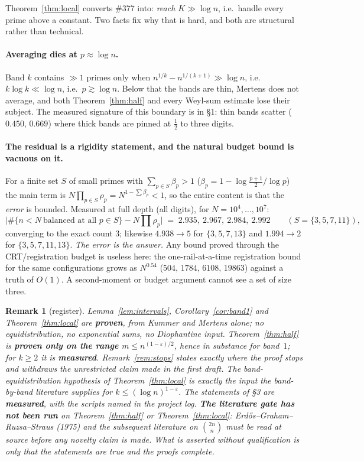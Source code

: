 \documentclass[11pt]{article}
\newtheorem{remark}[theorem]{Remark}
\begin{document}
Theorem~\ref{thm:local} converts \#377 into: \emph{reach $K\gg\log n$}, i.e.\
handle every prime above a constant.  Two facts fix why that is hard, and both
are structural rather than technical.

\paragraph{Averaging dies at $p\approx\log n$.}  Band $k$ contains
$\gg1$ primes only when $n^{1/k}-n^{1/(k+1)}\gg\log n$, i.e.\ $k\log k\ll\log n$,
i.e.\ $p\gtrsim\log n$.  Below that the bands are thin, Mertens does not
average, and both Theorem~\ref{thm:half} and every Weyl-sum estimate lose their
subject.  The measured signature of this boundary is in \S1: thin bands scatter
($0.450$, $0.669$) where thick bands are pinned at $\tfrac12$ to three digits.

\paragraph{The residual is a rigidity statement, and the natural budget bound is
vacuous on it.}  For a finite set $S$ of small primes with
$\sum_{p\in S}\beta_p>1$ ($\beta_p=1-\log\frac{p+1}2/\log p$) the main term is
$N\prod_{p\in S}\rho_p=N^{1-\sum\beta_p}<1$, so the entire content is that the
\emph{error} is bounded.  Measured at full depth (all digits), for
$N=10^4,\dots,10^7$:
\[
  \bigl|\#\{n<N\ \text{balanced at all }p\in S\}-N\textstyle\prod\rho_p\bigr|
  \;=\;2.935,\ 2.967,\ 2.984,\ 2.992\qquad(S=\{3,5,7,11\}),
\]
converging to the exact count $3$; likewise $4.938\to5$ for $\{3,5,7,13\}$ and
$1.994\to2$ for $\{3,5,7,11,13\}$.  \emph{The error is the answer.}  Any bound
proved through the CRT/registration budget is useless here: the one-rail-at-a-time
registration bound for the same configurations grows as $N^{0.54}$
($504,\,1784,\,6108,\,19863$) against a truth of $O(1)$.  A second-moment or
budget argument cannot see a set of size three.

\begin{remark}[register]
Lemma~\ref{lem:intervals}, Corollary~\ref{cor:band1} and
Theorem~\ref{thm:local} are \textbf{proven}, from Kummer and Mertens alone; no
equidistribution, no exponential sums, no Diophantine input.
Theorem~\ref{thm:half} is \textbf{proven only on the range
$m\le n^{(1-\varepsilon)/2}$}, hence in substance for band~$1$; for $k\ge2$ it
is \textbf{measured}.  Remark~\ref{rem:stops} states exactly where the proof
stops and withdraws the unrestricted claim made in the first draft.  The
band-equidistribution hypothesis of Theorem~\ref{thm:local} is exactly the input
the band-by-band literature supplies for $k\le(\log n)^{1-\varepsilon}$.  The
statements of \S3 are \textbf{measured}, with the scripts named in the project
log.  \textbf{The literature gate has not been run} on Theorem~\ref{thm:half} or
Theorem~\ref{thm:local}: Erd\H{o}s--Graham--Ruzsa--Straus (1975) and the
subsequent literature on $\binom{2n}{n}$ must be read at source before any
novelty claim is made.  What is asserted without qualification is only that the
statements are true and the proofs complete.
\end{remark}
\end{document}
